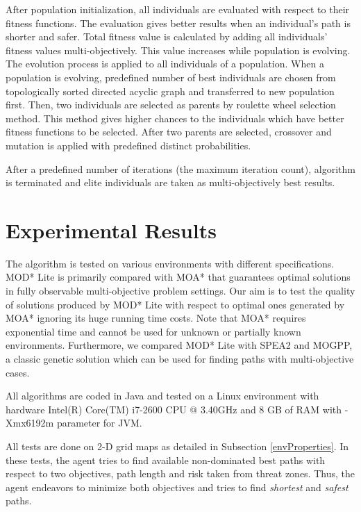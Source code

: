 \documentclass[10pt,journal]{IEEEtran}
\begin{document}
After population initialization, all individuals are evaluated with respect to their fitness functions. The evaluation gives better results when an individual's path is shorter and safer. Total fitness value is calculated by adding all individuals' fitness values multi-objectively. This value increases while population is evolving. The evolution process is applied to all individuals of a population. When a population is evolving, predefined number of best individuals are chosen from topologically sorted directed acyclic graph and transferred to new population first. Then, two individuals are selected as parents by roulette wheel selection method. This method gives higher chances to the individuals which have better fitness functions to be selected. After two parents are selected, crossover and mutation is applied with predefined distinct probabilities.

After a predefined number of iterations (the maximum iteration count), algorithm is terminated and elite individuals are taken as multi-objectively best results.  

\section{Experimental Results}
\label{chapter:experiments}

The algorithm is tested on various environments with different specifications. MOD* Lite is primarily compared with MOA* that guarantees optimal solutions in fully observable multi-objective problem settings. Our aim is to test the quality of solutions produced by MOD* Lite with respect to optimal ones generated by MOA* ignoring its huge running time costs. Note that MOA* requires exponential time and cannot be used for unknown or partially known environments.  Furthermore, we  compared MOD* Lite with SPEA2 and MOGPP, a classic genetic solution which can be used for finding paths with multi-objective cases.

All algorithms are coded in Java and tested on a Linux environment with hardware Intel(R) Core(TM) i7-2600 CPU @ 3.40GHz and 8 GB of RAM with -Xmx6192m parameter for JVM.

All tests are done on 2-D grid maps as detailed in Subsection \ref{envProperties}. In these tests, the agent tries to find available non-dominated best paths with respect to two objectives, path length and risk taken from threat zones. Thus, the agent endeavors to minimize both objectives and tries to find \textit{shortest} and \textit{safest} paths.
\end{document}
